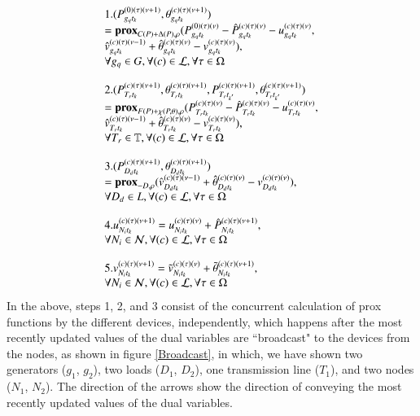 \documentclass[preprint,12pt,3p]{elsarticle}
\begin{document}
	\begin{equation}\label{Prox_Lookahead_Demand}
	\begin{array}{ll}
	1.(P_{{g_q}{t_k}}^{(0)(\tau)(\nu+1)},\theta_{{g_q}{t_k}}^{(c)(\tau)(\nu+1)})\notag\\=\mathbf{prox}_{C(P)+\Delta(P),\rho}(P_{{g_q}{t_k}}^{(0)(\tau)(\nu)}-\hat{P}_{{g_q}{t_k}}^{(c)(\tau)(\nu)}-u_{{g_q}{t_k}}^{(c)(\tau)(\nu)},\\ \hat{v}_{{g_q}{t_k}}^{(c)(\tau)(\nu-1)}+\hat{\theta}_{{g_q}{t_k}}^{(c)(\tau)(\nu)}-v_{{g_q}{t_k}}^{(c)(\tau)(\nu)}),\\\forall g_q\in G,\forall(c)\in\mathcal{L},\forall\tau\in\Omega\\
	\\
	2.(P_{{T_r}{t_k}}^{(c)(\tau)(\nu+1)},\theta_{{T_r}{t_k}}^{(c)(\tau)(\nu+1)},P_{{T_r}{t_{k^{'}}}}^{(c)(\tau)(\nu+1)},\theta_{{T_r}{t_{k^{'}}}}^{(c)(\tau)(\nu+1)})\notag\\=\mathbf{prox}_{F(P)+\chi(P,\theta),\rho}(P_{{T_r}{t_k}}^{(c)(\tau)(\nu)}-\hat{P}_{{T_r}{t_k}}^{(c)(\tau)(\nu)}-u_{{T_r}{t_k}}^{(c)(\tau)(\nu)}, \\\hat{v}_{{T_r}{t_k}}^{(c)(\tau)(\nu-1)}+\hat{\theta}_{{T_r}{t_k}}^{(c)(\tau)(\nu)}-v_{{T_r}{t_k}}^{(c)(\tau)(\nu)}),
	\\\forall T_r\in \mathbb{T},\forall(c)\in\mathcal{L},\forall\tau\in\Omega\\
	\\
	3.(P_{{D_d}{t_k}}^{(c)(\tau)(\nu+1)},\theta_{{D_d}{t_k}}^{(c)(\tau)(\nu+1)})\notag\\=\mathbf{prox}_{-D,\rho}(\hat{v}_{{D_d}{t_k}}^{(c)(\tau)(\nu-1)}+\hat{\theta}_{{D_d}{t_k}}^{(c)(\tau)(\nu)}-v_{{D_d}{t_k}}^{(c)(\tau)(\nu)}),\\\forall D_d\in L,\forall(c)\in\mathcal{L},\forall\tau\in\Omega\\
	\\
	4.u_{{N_i}{t_k}}^{(c)(\tau)(\nu+1)}=u_{{N_i}{t_k}}^{(c)(\tau)(\nu)}+\hat{P}_{{N_i}{t_k}}^{(c)(\tau)(\nu+1)},\\\forall N_i\in\mathcal{N},\forall(c)\in\mathcal{L},\forall\tau\in\Omega\\
	\\
	5.v_{{N_i}{t_k}}^{(c)(\tau)(\nu+1)}=\tilde{v}_{{N_i}{t_k}}^{(c)(\tau)(\nu)}+\tilde{\theta}_{{N_i}{t_k}}^{(c)(\tau)(\nu+1)},\\\forall N_i\in\mathcal{N},\forall(c)\in\mathcal{L},\forall\tau\in\Omega
	\end{array}
	\end{equation}
	In the above, steps 1, 2, and 3 consist of the concurrent calculation of prox functions by the different devices, independently, which happens after the most recently updated values of the dual variables are ``broadcast" to the devices from the nodes, as shown in figure \ref{Broadcast}, in which, we have shown two generators ($g_1$, $g_2$), two loads ($D_1$, $D_2$), one transmission line ($T_1$), and two nodes ($N_1$, $N_2$). The direction of the arrows show the direction of conveying the most recently updated values of the dual variables.
\end{document}
